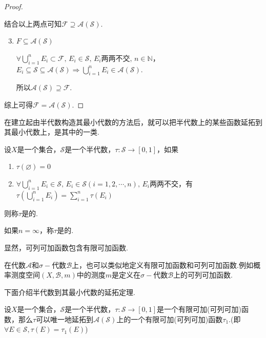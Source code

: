 \begin{proof}
\begin{enumerate}[label=(\arabic*)]
\begin{enumerate}[label=(\roman*)]
        \end{enumerate}
    \end{enumerate}\par
    结合以上两点可知$\mathcal{F}\supseteq\mathcal{A}(\mathcal{S})$.
    \begin{enumerate}[label=(\arabic*)]
        \setcounter{enumi}{2}
        \item $F\subseteq\mathcal{A}(\mathcal{S})$\par
        $\forall \bigcup_{i=1}^n{E_i}\subset\mathcal{F},\, E_i\in\mathcal{S},\, E_i\text{两两不交},\,n\in\mathbb{N}$，$E_i\subseteq\mathcal{S}\subseteq\mathcal{A}(\mathcal{S})\Rightarrow \bigcup_{i=1}^n{E_i}\in\mathcal{A}(\mathcal{S})$.\par
        所以$\mathcal{A}(\mathcal{S})\supseteq\mathcal{F}$.
    \end{enumerate}\par
    综上可得$\mathcal{F}=\mathcal{A}(\mathcal{S})$.
\end{proof}
在建立起由半代数构造其最小代数的方法后，就可以把半代数上的某些函数延拓到其最小代数上，是其中的一类.
\begin{definition}
    \wideline
    设$X$是一个集合，$\mathcal{S}$是一个半代数，$\tau:\mathcal{S}\to[0,1]$，如果
    \begin{enumerate}
        \item $\tau(\varnothing)=0$
        \item $\forall\bigcup_{i=1}^n{E_i}\in\mathcal{S},\, E_i\in\mathcal{S}(i=1,2,\cdots,n),\, E_i两两不交$，有$\tau\left(\bigcup_{i=1}^n{E_i}\right)=\sum_{i=1}^n{\tau(E_i)}$
    \end{enumerate}
    则称$\tau$是的.\par
    如果$n=\infty$，称$\tau$是的.
\end{definition}
显然，可列可加函数包含有限可加函数.\par
在代数$\mathcal{A}$和$\sigma-\!\!$代数$\mathcal{B}$上，也可以类似地定义有限可加函数和可列可加函数.例如概率测度空间$(X,\mathcal{B},m)$中的测度$m$是定义在$\sigma-\!\!$代数$\mathcal{B}$上的可列可加函数.\par
下面介绍半代数到其最小代数的延拓定理.\par
\begin{theorem}
    设$X$是一个集合，$\mathcal{S}$是一个半代数，$\tau:\mathcal{S}\to[0,1]$是一个有限可加(可列可加)函数，那么$\tau$可以唯一地延拓到$\mathcal{A}(\mathcal{S})$上的一个有限可加(可列可加)函数$\tau_1$.(即$\forall E\in\mathcal{S},\tau(E)=\tau_1(E)$)
\end{theorem}

